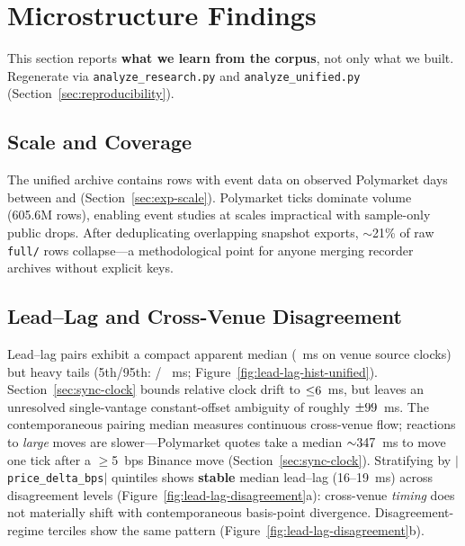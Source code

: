 \section{Microstructure Findings}
\label{sec:insights}

This section reports \textbf{what we learn from the corpus}, not only what we
built. Regenerate via \texttt{analyze\_research.py} and
\texttt{analyze\_unified.py} (Section~\ref{sec:reproducibility}).

\subsection{Scale and Coverage}
\label{sec:insights-scale}

The unified archive contains \OpenMarketTotalRows{} rows with event data on
\OpenMarketPolyObservedDays{} observed Polymarket days between
\OpenMarketDataFirstDay{} and \OpenMarketDataLastDay{}
(Section~\ref{sec:exp-scale}).
Polymarket ticks dominate volume
(605.6M rows), enabling event studies at scales impractical with sample-only
public drops. After deduplicating overlapping snapshot exports, ${\sim}$21\% of
raw \texttt{full/} rows collapse---a methodological point for anyone merging
recorder archives without explicit keys.

\subsection{Lead--Lag and Cross-Venue Disagreement}
\label{sec:insights-leadlag}

Lead--lag pairs exhibit a compact apparent median (\OpenMarketLagMedian{}~ms
on venue source clocks) but heavy tails (5th/95th:
\OpenMarketLagPFive{} / \OpenMarketLagPNinetyFive{}~ms;
Figure~\ref{fig:lead-lag-hist-unified}). Section~\ref{sec:sync-clock} bounds
relative clock drift to ${\leq}6{}$~ms, but leaves an
unresolved single-vantage constant-offset ambiguity of roughly
$\pm99{}$~ms. The contemporaneous pairing median
measures continuous cross-venue flow; reactions to \emph{large} moves are
slower---Polymarket quotes take a median
${\sim}347{}$~ms to move one tick after a
$\geq$5~bps Binance move (Section~\ref{sec:sync-clock}). Stratifying by $|$\texttt{price\_delta\_bps}$|$
quintiles shows \textbf{stable} median lead--lag (16--19~ms) across disagreement
levels (Figure~\ref{fig:lead-lag-disagreement}a): cross-venue \emph{timing} does
not materially shift with contemporaneous basis-point divergence.
Disagreement-regime terciles show the same pattern
(Figure~\ref{fig:lead-lag-disagreement}b).

